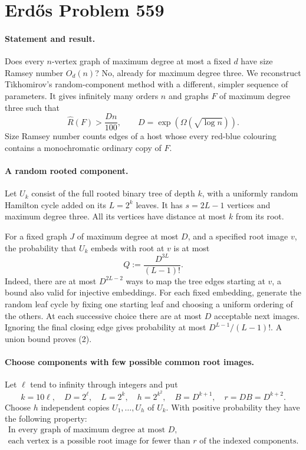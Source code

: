 \section*{Erd\H{o}s Problem 559}

\paragraph{Statement and result.}
Does every \(n\)-vertex graph of maximum degree at most a fixed
\(d\) have size Ramsey number \(O_d(n)\)? No, already for maximum
degree three. We reconstruct Tikhomirov's random-component method
with a different, simpler sequence of parameters. It gives infinitely
many orders \(n\) and graphs \(F\) of maximum degree three such that
\[
 \widehat R(F)>\frac{Dn}{100},\qquad
 D=\exp(\Omega(\sqrt{\log n})). \tag{1}
\]
Size Ramsey number counts edges of a host whose every red-blue
colouring contains a monochromatic ordinary copy of \(F\).

\paragraph{A random rooted component.}
Let \(U_k\) consist of the full rooted binary tree of depth \(k\),
with a uniformly random Hamilton cycle added on its \(L=2^k\)
leaves. It has \(s=2L-1\) vertices and maximum degree three.
All its vertices have distance at most \(k\) from its root.

For a fixed graph \(J\) of maximum degree at most \(D\), and a
specified root image \(v\), the probability that \(U_k\) embeds
with root at \(v\) is at most
\[
 Q:=\frac{D^{3L}}{(L-1)!}. \tag{2}
\]
Indeed, there are at most \(D^{2L-2}\) ways to map the tree edges
starting at \(v\), a bound also valid for injective embeddings.
For each fixed embedding, generate the random leaf cycle by fixing
one starting leaf and choosing a uniform ordering of the others.
At each successive choice there are at most \(D\) acceptable next
images. Ignoring the final closing edge gives probability at most
\(D^{L-1}/(L-1)!\). A union bound proves (2).

\paragraph{Choose components with few possible common root images.}
Let \(\ell\) tend to infinity through integers and put
\[
 k=10\ell,\quad D=2^\ell,\quad L=2^k,\quad
 h=2^{k^2},\quad B=D^{k+1},\quad r=DB=D^{k+2}.
\]
Choose \(h\) independent copies \(U_1,\ldots,U_h\) of \(U_k\).
With positive probability they have the following property:
\[
 \begin{gathered}
 \text{In every graph of maximum degree at most }D,\\
 \text{each vertex is a possible root image for fewer than }r
 \text{ of the indexed components.}
 \end{gathered} \tag{3}
\]

